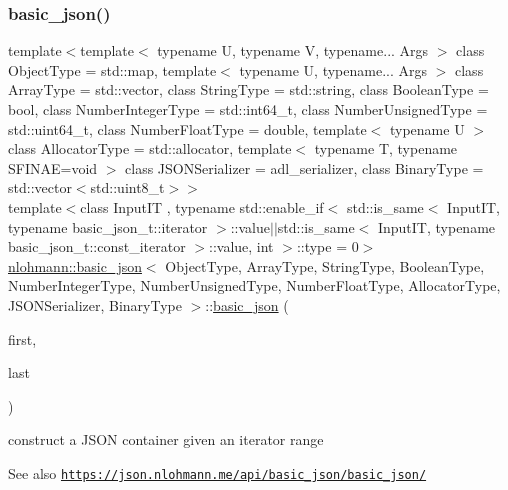 \subsubsection{\texorpdfstring{basic\+\_\+json()}{basic\_json()}\hspace{0.1cm}{\footnotesize\ttfamily [7/9]}}
{\footnotesize\ttfamily template$<$template$<$ typename U, typename V, typename... Args $>$ class Object\+Type = std\+::map, template$<$ typename U, typename... Args $>$ class Array\+Type = std\+::vector, class String\+Type  = std\+::string, class Boolean\+Type  = bool, class Number\+Integer\+Type  = std\+::int64\+\_\+t, class Number\+Unsigned\+Type  = std\+::uint64\+\_\+t, class Number\+Float\+Type  = double, template$<$ typename U $>$ class Allocator\+Type = std\+::allocator, template$<$ typename T, typename S\+F\+I\+N\+A\+E=void $>$ class J\+S\+O\+N\+Serializer = adl\+\_\+serializer, class Binary\+Type  = std\+::vector$<$std\+::uint8\+\_\+t$>$$>$ \\
template$<$class Input\+IT , typename std\+::enable\+\_\+if$<$ std\+::is\+\_\+same$<$ Input\+I\+T, typename basic\+\_\+json\+\_\+t\+::iterator $>$\+::value$\vert$$\vert$std\+::is\+\_\+same$<$ Input\+I\+T, typename basic\+\_\+json\+\_\+t\+::const\+\_\+iterator $>$\+::value, int $>$\+::type  = 0$>$ \\
\hyperlink{classnlohmann_1_1basic__json}{nlohmann\+::basic\+\_\+json}$<$ Object\+Type, Array\+Type, String\+Type, Boolean\+Type, Number\+Integer\+Type, Number\+Unsigned\+Type, Number\+Float\+Type, Allocator\+Type, J\+S\+O\+N\+Serializer, Binary\+Type $>$\+::\hyperlink{classnlohmann_1_1basic__json}{basic\+\_\+json} (\begin{DoxyParamCaption}\item[{Input\+IT}]{first,  }\item[{Input\+IT}]{last }\end{DoxyParamCaption})\hspace{0.3cm}{\ttfamily [inline]}}



construct a J\+S\+ON container given an iterator range 

\begin{DoxySeeAlso}{See also}
\href{https://json.nlohmann.me/api/basic_json/basic_json/}{\tt https\+://json.\+nlohmann.\+me/api/basic\+\_\+json/basic\+\_\+json/} 
\end{DoxySeeAlso}
\mbox{\label{classnlohmann_1_1basic__json_a603be713183ad63dd8c9e1052c606004}} 
